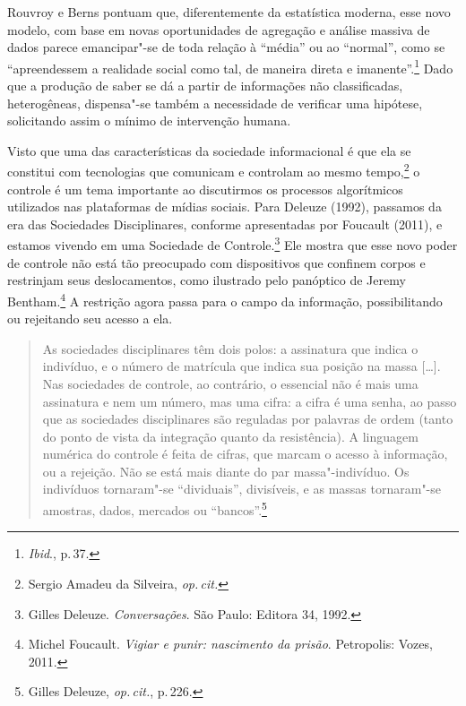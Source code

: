 Rouvroy e Berns pontuam que, diferentemente da estatística
moderna, esse novo modelo, com base em novas oportunidades de agregação
e análise massiva de dados parece emancipar"-se de toda relação à
``média'' ou ao ``normal'', como se ``apreendessem a realidade social
como tal, de maneira direta e imanente''.\footnote{\textit{Ibid}., p.\,37.} Dado que a produção
de saber se dá a partir de informações não classificadas, heterogêneas,
dispensa"-se também a necessidade de verificar uma hipótese, solicitando
assim o mínimo de intervenção humana.

Visto que uma das características da sociedade informacional é que ela
se constitui com tecnologias que comunicam e controlam ao mesmo tempo,\footnote{Sergio Amadeu da Silveira, \textit{op.\,cit.}}
o controle é um tema importante ao discutirmos os
processos algorítmicos utilizados nas plataformas de mídias sociais.
Para Deleuze (1992), passamos da era das Sociedades Disciplinares,
conforme apresentadas por Foucault (2011), e estamos vivendo em uma Sociedade de Controle.\footnote{Gilles Deleuze. \textit{Conversações}. São Paulo: Editora 34, 1992.} Ele mostra que esse novo poder de controle não está tão
preocupado com dispositivos que confinem corpos e restrinjam seus
deslocamentos, como ilustrado pelo panóptico de Jeremy Bentham.\footnote{Michel Foucault. \textit{Vigiar e punir: nascimento da prisão}. Petropolis: Vozes, 2011.}
A restrição agora passa para o campo da informação, possibilitando ou rejeitando seu acesso a ela.

\begin{quote}
As sociedades disciplinares têm dois polos: a assinatura que indica o
indivíduo, e o número de matrícula que indica sua posição na massa
{[}\ldots{}{]}. Nas sociedades de controle, ao contrário, o essencial não é mais
uma assinatura e nem um número, mas uma cifra: a cifra é uma senha, ao
passo que as sociedades disciplinares são reguladas por palavras de
ordem (tanto do ponto de vista da integração quanto da resistência). A
linguagem numérica do controle é feita de cifras, que marcam o acesso à
informação, ou a rejeição. Não se está mais diante do par
massa"-indivíduo. Os indivíduos tornaram"-se ``dividuais'', divisíveis, e
as massas tornaram"-se amostras, dados, mercados ou ``bancos''.\footnote{Gilles Deleuze, \textit{op.\,cit.}, p.\,226.}
\end{quote}

